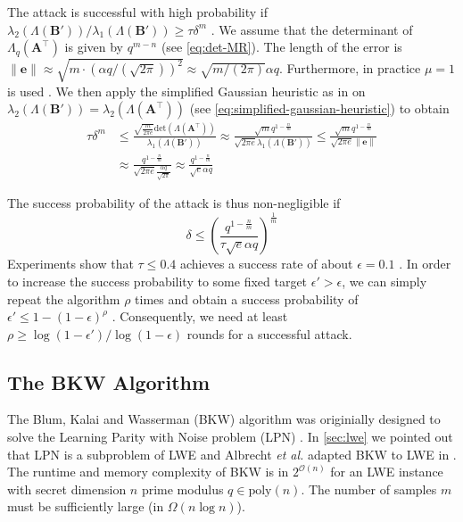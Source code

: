 The attack is successful with high probability if $\lambda_2(\Lambda(\mathbf{B}'))/\lambda_1(\Lambda(\mathbf{B}')) \geq \tau \delta^m$ \cite{AFG13}. We assume that the determinant of $\Lambda_q(\mathbf{A}^\intercal)$ is given by $q^{m-n}$ (see \cref{eq:det-MR}). The length of the error is $\|\mathbf{e}\| \approx \sqrt{m\cdot \left(\alpha q / (\sqrt{2\pi})\right)^2} \approx \sqrt{m / (2\pi)} \alpha q$. Furthermore, in practice $\mu=1$ is used \cite{APS15}. We then apply the simplified Gaussian heuristic as in \cite{Gop16} on $\lambda_2(\Lambda(\mathbf{B}'))=\lambda_2(\Lambda(\mathbf{A}^\intercal))$ (see \cref{eq:simplified-gaussian-heuristic}) to obtain
\begin{align*}
  \tau \delta^m & \leq \frac{ \sqrt{\frac{m}{2\pi e}} \text{det}(\Lambda(\mathbf{A}^\intercal))}{\lambda_1(\Lambda(\mathbf{B}'))} \approx \frac{\sqrt{m} q^{1-\frac{n}{m}}}{\sqrt{2\pi e} \lambda_1(\Lambda(\mathbf{B}'))} \leq \frac{\sqrt{m} q^{1-\frac{n}{m}}}{\sqrt{2\pi e} \|\mathbf{e}\|} \\
                & \approx \frac{q^{1-\frac{n}{m}}}{\sqrt{2\pi e}  \frac{\alpha q}{\sqrt{2\pi}}} \approx \frac{q^{1-\frac{n}{m}}}{\sqrt{e} \alpha q}
\end{align*}

The success probability of the attack is thus non-negligible if
\begin{equation}
  \delta \leq \left(\frac{q^{1-\frac{n}{m}}}{\tau \sqrt{e} \alpha q}\right)^{\frac{1}{m}}
\end{equation}
Experiments show that $\tau \leq 0.4$ achieves a success rate of about $\epsilon = 0.1$ \cite{AFG13}. In order to increase the success probability to some fixed target $\epsilon' > \epsilon$, we can simply repeat the algorithm $\rho$ times and obtain a success probability of $\epsilon' \leq 1 - (1 - \epsilon)^\rho$ \cite{BBGS19}. Consequently, we need at least $\rho \geq \log(1-\epsilon')/\log(1-\epsilon)$ rounds for a successful attack.

\subsection[The BKW Algorithm]{The BKW Algorithm \cite{BKW03}}
The Blum, Kalai and Wasserman (BKW) algorithm was originially designed to solve the Learning Parity with Noise problem (LPN) \cite{BKW03}. In \cref{sec:lwe} we pointed out that LPN is a subproblem of LWE and Albrecht \textit{et al.} adapted BKW to LWE in \cite{ACFFP15a}. The runtime and memory complexity of BKW is in $2^{\mathcal{O}(n)}$ for an LWE instance with secret dimension $n$ prime modulus $q \in \text{poly}(n)$. The number of samples $m$ must be sufficiently large (in $\mathcal{\Omega}(n \log n)$). %

